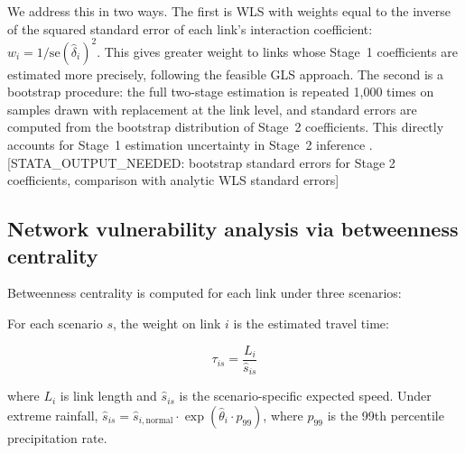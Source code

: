 \documentclass[review]{elsarticle}
\begin{document}
We address this in two ways. The first is WLS with weights equal to the inverse of the squared standard error of each link's interaction coefficient: $w_i = 1 / \text{se}(\hat{\delta}_i)^2$. This gives greater weight to links whose Stage~1 coefficients are estimated more precisely, following the feasible GLS approach. The second is a bootstrap procedure: the full two-stage estimation is repeated 1{,}000 times on samples drawn with replacement at the link level, and standard errors are computed from the bootstrap distribution of Stage~2 coefficients. This directly accounts for Stage~1 estimation uncertainty in Stage~2 inference \citep{murphy1985estimation}. [STATA\_OUTPUT\_NEEDED: bootstrap standard errors for Stage 2 coefficients, comparison with analytic WLS standard errors]


\subsection{Network vulnerability analysis via betweenness centrality}
\label{sec:method:centrality}

Betweenness centrality \citep{freeman1977centrality} is computed for each link under three scenarios:


For each scenario $s$, the weight on link $i$ is the estimated travel time:

\begin{equation}
\label{eq:traveltime}
\tau_{is} = \frac{L_i}{\hat{s}_{is}}
\end{equation}

\noindent where $L_i$ is link length and $_{is}$ is the scenario-specific expected speed. Under extreme rainfall, $_{is} = _{i,} \cdot \exp(\hat{\theta}_i \cdot p_{99})$, where $p_{99}$ is the 99th percentile precipitation rate.
\end{document}
